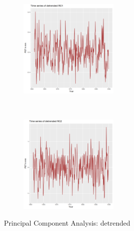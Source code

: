\documentclass[12pt,a4paper]{article}
\begin{document}
\begin{figure}[!h]
    \centering
    \begin{subfigure}[t]{0.5\textwidth}
        \centering
        \includegraphics[height=1.9in]{./gaphics/q002_g.png}
        \caption{}
    \end{subfigure}%
    ~ 
    \begin{subfigure}[t]{0.5\textwidth}
        \centering
        \includegraphics[height=1.9in]{./gaphics/q002_h.png}
        \caption{}
    \end{subfigure}
    \caption{Principal Component Analysis: detrended}
\end{figure}
\end{document}
